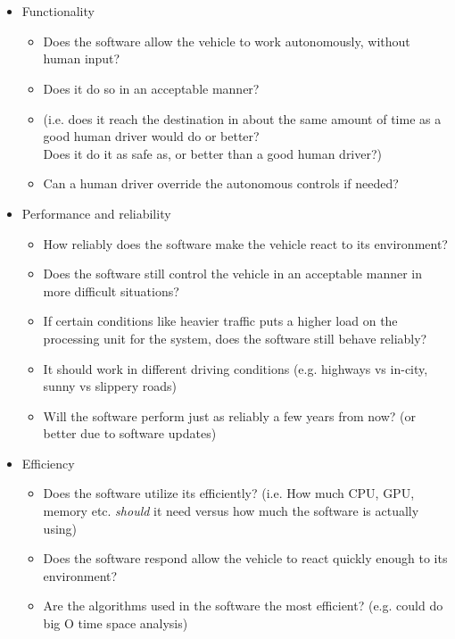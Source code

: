 \documentclass[letterpaper]{article}
\begin{document}
\section{}

\begin{itemize}
	\item Functionality
	      \begin{itemize}
		      \item Does the software allow the vehicle to work autonomously, without human input?
		      \item Does it do so in an acceptable manner?
		      \item (i.e. does it reach the destination in about the same amount of time as a good human driver would do or better?\\
		            Does it do it as safe as, or better than a good human driver?)
		      \item Can a human driver override the autonomous controls if needed?
	      \end{itemize}

	\item Performance and reliability
	      \begin{itemize}
		      \item How reliably does the software make the vehicle react to its environment?
		      \item Does the software still control the vehicle in an acceptable manner in more difficult situations?
		      \item If certain conditions like heavier traffic puts a higher load on the processing unit for the system, does the software still behave reliably?
		      \item It should work in different driving conditions (e.g. highways vs in-city, sunny vs slippery roads)
		      \item Will the software perform just as reliably a few years from now? (or better due to software updates)
	      \end{itemize}

	\item Efficiency
	      \begin{itemize}
		      \item Does the software utilize its efficiently?
		            (i.e. How much CPU, GPU, memory etc. \textit{should} it need versus how much the software is actually using)
		      \item Does the software respond allow the vehicle to react quickly enough to its environment?
		      \item Are the algorithms used in the software the most efficient? (e.g. could do big O time space analysis)
	      \end{itemize}


\end{itemize}
\end{document}

